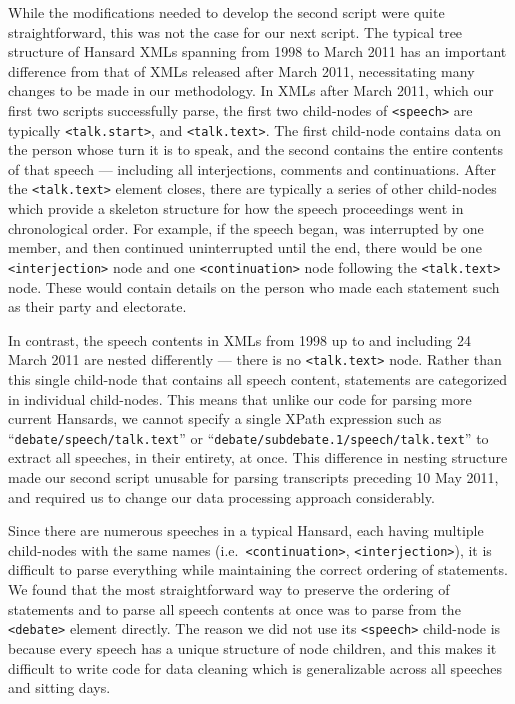 \documentclass[
  letterpaper,
  DIV=11,
  numbers=noendperiod]{scrartcl}
\begin{document}
While the modifications needed to develop the second script were quite
straightforward, this was not the case for our next script. The typical
tree structure of Hansard XMLs spanning from 1998 to March 2011 has an
important difference from that of XMLs released after March 2011,
necessitating many changes to be made in our methodology. In XMLs after
March 2011, which our first two scripts successfully parse, the first
two child-nodes of \texttt{\textless{}speech\textgreater{}} are
typically \texttt{\textless{}talk.start\textgreater{}}, and
\texttt{\textless{}talk.text\textgreater{}}. The first child-node
contains data on the person whose turn it is to speak, and the second
contains the entire contents of that speech --- including all
interjections, comments and continuations. After the
\texttt{\textless{}talk.text\textgreater{}} element closes, there are
typically a series of other child-nodes which provide a skeleton
structure for how the speech proceedings went in chronological order.
For example, if the speech began, was interrupted by one member, and
then continued uninterrupted until the end, there would be one
\texttt{\textless{}interjection\textgreater{}} node and one
\texttt{\textless{}continuation\textgreater{}} node following the
\texttt{\textless{}talk.text\textgreater{}} node. These would contain
details on the person who made each statement such as their party and
electorate.

In contrast, the speech contents in XMLs from 1998 up to and including
24 March 2011 are nested differently --- there is no
\texttt{\textless{}talk.text\textgreater{}} node. Rather than this
single child-node that contains all speech content, statements are
categorized in individual child-nodes. This means that unlike our code
for parsing more current Hansards, we cannot specify a single XPath
expression such as ``\texttt{debate/speech/talk.text}'' or
``\texttt{debate/subdebate.1/speech/talk.text}'' to extract all
speeches, in their entirety, at once. This difference in nesting
structure made our second script unusable for parsing transcripts
preceding 10 May 2011, and required us to change our data processing
approach considerably.

Since there are numerous speeches in a typical Hansard, each having
multiple child-nodes with the same names
(i.e.~\texttt{\textless{}continuation\textgreater{}},
\texttt{\textless{}interjection\textgreater{}}), it is difficult to
parse everything while maintaining the correct ordering of statements.
We found that the most straightforward way to preserve the ordering of
statements and to parse all speech contents at once was to parse from
the \texttt{\textless{}debate\textgreater{}} element directly. The
reason we did not use its \texttt{\textless{}speech\textgreater{}}
child-node is because every speech has a unique structure of node
children, and this makes it difficult to write code for data cleaning
which is generalizable across all speeches and sitting days.
\end{document}
